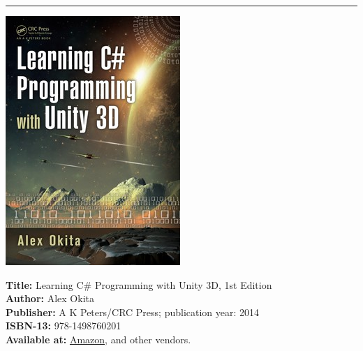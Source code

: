 \documentclass[11pt, a4paper]{article}
\begin{document}
\hrule
\vspace{.1cm}
\begin{minipage}[b]{0.17\linewidth}          
	\includegraphics[width=.95\linewidth]{includes/images/learningUnityCSharp.jpg}
\end{minipage}\hfill
\begin{minipage}[b]{0.75\linewidth}          
	\noindent \textbf{Title:} Learning C\# Programming with Unity 3D, 1st Edition \\
	\textbf{Author:} Alex Okita \\
	\textbf{Publisher:} A K Peters/CRC Press; publication year: 2014  \\
	\textbf{ISBN-13:} 978-1498760201\\         
	\textbf{Available at:}     
	\href{https://www.amazon.ca/Learning-C-Programming-Unity-3D/dp/1466586524/}{Amazon},
	and other vendors. \\
\end{minipage}
\end{document}
